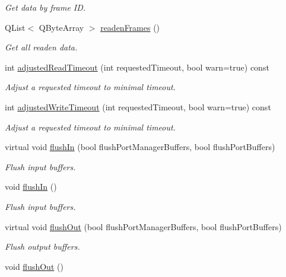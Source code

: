 \begin{DoxyCompactItemize}
\begin{DoxyCompactList}\small\item\em Get data by frame ID. \end{DoxyCompactList}\item 
QList$<$ QByteArray $>$ \hyperlink{classmdt_port_manager_addd5dcae9644cea42a9871205af41796}{readenFrames} ()
\begin{DoxyCompactList}\small\item\em Get all readen data. \end{DoxyCompactList}\item 
int \hyperlink{classmdt_port_manager_a7cb3155940e23db0122d14f21fca858d}{adjustedReadTimeout} (int requestedTimeout, bool warn=true) const 
\begin{DoxyCompactList}\small\item\em Adjust a requested timeout to minimal timeout. \end{DoxyCompactList}\item 
int \hyperlink{classmdt_port_manager_a9d6782be514745a1b1392216d17d41df}{adjustedWriteTimeout} (int requestedTimeout, bool warn=true) const 
\begin{DoxyCompactList}\small\item\em Adjust a requested timeout to minimal timeout. \end{DoxyCompactList}\item 
virtual void \hyperlink{classmdt_port_manager_ac0844a5cd4043a95a479d458ac7ce590}{flushIn} (bool flushPortManagerBuffers, bool flushPortBuffers)
\begin{DoxyCompactList}\small\item\em Flush input buffers. \end{DoxyCompactList}\item 
void \hyperlink{classmdt_port_manager_a4c44ce6ec40c4afc6be441c10d7ee827}{flushIn} ()
\begin{DoxyCompactList}\small\item\em Flush input buffers. \end{DoxyCompactList}\item 
virtual void \hyperlink{classmdt_port_manager_a3f0c2722a41c49de2bea9013bccd049c}{flushOut} (bool flushPortManagerBuffers, bool flushPortBuffers)
\begin{DoxyCompactList}\small\item\em Flush output buffers. \end{DoxyCompactList}\item 
void \hyperlink{classmdt_port_manager_ab34018a9653a5af784fa7da06a9e50d3}{flushOut} ()

\end{DoxyCompactItemize}
